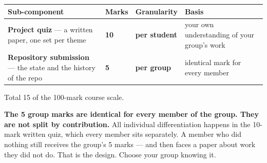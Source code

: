 \documentclass[11pt]{article}
\begin{document}
{\footnotesize
\begin{longtable}[]{@{}llll@{}}
\toprule
\begin{minipage}[b]{0.22\columnwidth}\raggedright
Sub-component\strut
\end{minipage} & \begin{minipage}[b]{0.22\columnwidth}\raggedright
Marks\strut
\end{minipage} & \begin{minipage}[b]{0.22\columnwidth}\raggedright
Granularity\strut
\end{minipage} & \begin{minipage}[b]{0.22\columnwidth}\raggedright
Basis\strut
\end{minipage}\tabularnewline
\midrule
\endhead
\begin{minipage}[t]{0.22\columnwidth}\raggedright
\textbf{Project quiz} --- a written paper, one set per theme\strut
\end{minipage} & \begin{minipage}[t]{0.22\columnwidth}\raggedright
\textbf{10}\strut
\end{minipage} & \begin{minipage}[t]{0.22\columnwidth}\raggedright
\textbf{per student}\strut
\end{minipage} & \begin{minipage}[t]{0.22\columnwidth}\raggedright
your own understanding of your group's work\strut
\end{minipage}\tabularnewline
\begin{minipage}[t]{0.22\columnwidth}\raggedright
\textbf{Repository submission} --- the state and the history of the repo\strut
\end{minipage} & \begin{minipage}[t]{0.22\columnwidth}\raggedright
\textbf{5}\strut
\end{minipage} & \begin{minipage}[t]{0.22\columnwidth}\raggedright
\textbf{per group}\strut
\end{minipage} & \begin{minipage}[t]{0.22\columnwidth}\raggedright
identical mark for every member\strut
\end{minipage}\tabularnewline
\bottomrule
\end{longtable}
}

Total 15 of the 100-mark course scale.

\textbf{The 5 group marks are identical for every member of the group. They are not
split by contribution.} All individual differentiation happens in the 10-mark
written quiz, which every member sits separately. A member who did nothing still
receives the group's 5 marks --- and then faces a paper about work they did not do.
That is the design. Choose your group knowing it.
\end{document}
